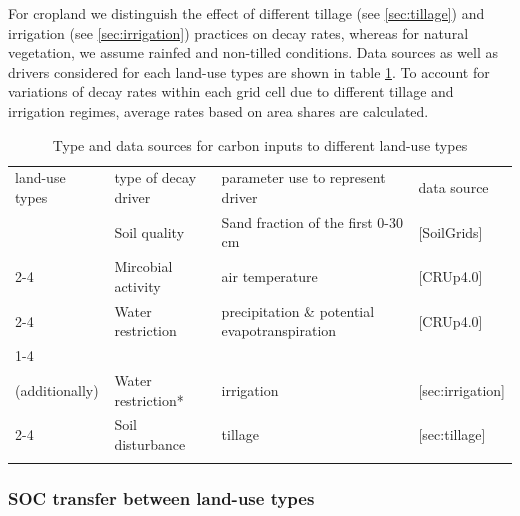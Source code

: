 \documentclass[gc, manuscript]{copernicus}
\begin{document}
For cropland we distinguish the effect of different tillage (see \ref{sec:tillage}) and irrigation (see \ref{sec:irrigation}) practices on decay rates, whereas for natural vegetation, we assume rainfed and non-tilled conditions. Data sources as well as drivers considered for each land-use types are shown in table \ref{tab:datasourcedecay}. To account for variations of decay rates within each grid cell due to different tillage and irrigation regimes, average rates based on area shares are calculated.

 \begin{table}[h]
 \caption{Type and data sources for carbon inputs to different land-use types}
 \begin{tabular}{l l l l}
 \tophline
  land-use types   & type of decay driver & parameter use to represent driver & data source \\
 \middlehline
 \multirow{2}{*}{all} & Soil quality & Sand fraction of the first 0-30 cm &  [SoilGrids]  \\
                      \cline{2-4}
                      
                      & Mircobial activity & air temperature & [CRUp4.0] \\
                      \cline{2-4}
                      
                      & Water restriction & precipitation \& potential evapotranspiration & [CRUp4.0] \\
                      \cline{1-4}
\multirow{2}{*}{\begin{minipage}[t]{0.2\columnwidth}\raggedright\strut Cropland\\(additionally)\strut\end{minipage}} & Water restriction*  & irrigation  & [sec:irrigation] \\ 
                      \cline{2-4}
                      
                      & Soil disturbance & tillage & [sec:tillage] \\
 \bottomhline
 \end{tabular}
 \belowtable{}
 \label{tab:datasourcedecay}
 \end{table}

\hypertarget{soc-transfer-between-land-use-types}{%
\subsubsection{SOC transfer between land-use types}\label{soc-transfer-between-land-use-types}}
\end{document}

